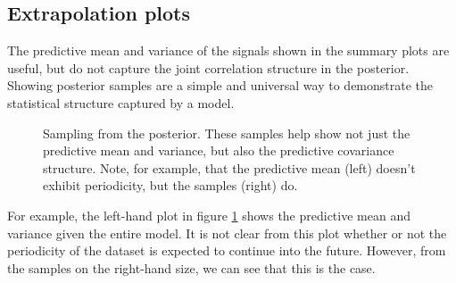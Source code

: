 \documentclass{article} %
\begin{document}
\subsection{Extrapolation plots}

The predictive mean and variance of the signals shown in the summary plots are useful, but do not capture the joint correlation structure in the posterior.  Showing posterior samples are a simple and universal way to demonstrate the statistical structure captured by a model.

\begin{figure}[h!]
\centering
{}
\caption{Sampling from the posterior.  These samples help show not just the predictive mean and variance, but also the predictive covariance structure.  Note, for example, that the predictive mean (left) doesn't exhibit periodicity, but the samples (right) do.}
\label{fig:extrap-full}
\end{figure}

For example, the left-hand plot in figure \ref{fig:extrap-full} shows the predictive mean and variance given the entire model. It is not clear from this plot whether or not the periodicity of the dataset is expected to continue into the future.  However, from the samples on the right-hand size, we can see that this is the case.  
\end{document}
